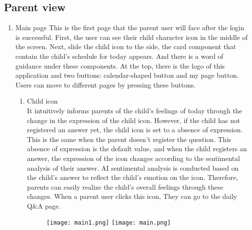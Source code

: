 \documentclass[conference]{IEEEtran}
\begin{document}
    \subsection{Parent view}
    \begin{enumerate}
    \item Main page \hfill \break
            This is the first page that the parent user will face after the login is successful. First, the user can see their child character icon in the middle of the screen. Next, slide the child icon to the side, the card component that contain the child’s schedule for today appears. And there is a word of guidance under these components. At the top, there is the logo of this application and two buttons: calendar-shaped button and my page button. Users can move to different pages by pressing these buttons.
            \begin{enumerate}
                \item Child icon\\
                It intuitively informs parents of the child's feelings of today through the change in the expression of the child icon. However, if the child has not registered an answer yet, the child icon is set to a absence of expression. This is the same when the parent doesn’t register the question. This absence of expression is the default value, and when the child registers an answer, the expression of the icon changes according to the sentimental analysis of their answer. AI sentimental analysis is conducted based on the child's answer to reflect the child's emotion on the icon. Therefore, parents can easily realize the child's overall feelings through these changes. When a parent user clicks this icon, They can go to the daily Q\&A page.
                \begin{figure}[H]
                 \centering
                 \texttt{[image: main1.png]}
                 \texttt{[image: main.png]}
                 \end{figure}
                

\end{enumerate}
\end{enumerate}
\end{document}
